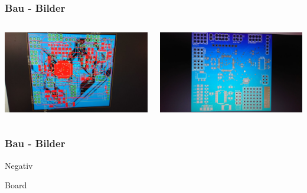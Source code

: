 \documentclass[12pt,a4paper, ngerman]{beamer}
\begin{document}
\begin{frame}
\frametitle{Bau - Bilder}
\begin{columns}
\begin{center}
\includegraphics[width=1\textwidth]{Board(1).jpg}
\end{center}
\begin{center}
\includegraphics[width=1\textwidth]{Board(2).jpg}
\end{center}
\end{columns}
\end{frame}

\begin{frame}
\frametitle{Bau - Bilder}
Negativ
\end{frame}

\begin{frame}
Board
\end{frame}
\end{document}
